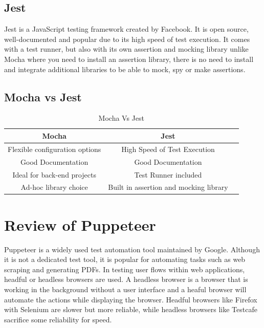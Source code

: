 \documentclass[12pt,a4paper,titlepage]{report}
\begin{document}
\subsection{Jest}

Jest is a JavaScript testing framework created by Facebook. It is open source, well-documented and popular due to its
high speed of test execution. It comes with a test runner, but also with its own assertion and mocking library unlike Mocha where you need to install an assertion
library, there is no need to install and integrate additional libraries to be able to mock, spy or make assertions.

\subsection{Mocha vs Jest}

\begin{table}[ht]
 \centering
 \small
 \setlength\tabcolsep{6pt}
 \begin{tabular}{|c|c|c}
  \hline \textbf
  {Mocha}       & \textbf {Jest}\\
  \hline\hline
  Flexible configuration options & High Speed of Test Execution\\
  \hline
  Good Documentation       & Good Documentation\\
  \hline
  Ideal for back-end projects  & Test Runner included\\
  \hline
  Ad-hoc library choice     & Built in assertion and mocking library\\
  \hline
 \end{tabular}
 \caption{Mocha Vs Jest}
\label{table:mocha:jest}
\end{table}

\section{Review of Puppeteer}

Puppeteer is a widely used test automation tool maintained by Google. Although it is not a dedicated test tool, it is popular for automating tasks such as web scraping and generating PDFs. 
In testing user flows within web applications, headful or headless browsers are used. A headless browser is a browser that is working in the background without a user interface and a heaful browser will automate the actions while displaying the browser. 
Headful browsers like Firefox with Selenium are slower but more reliable, while headless browsers like Testcafe sacrifice some reliability for speed.
\end{document}
